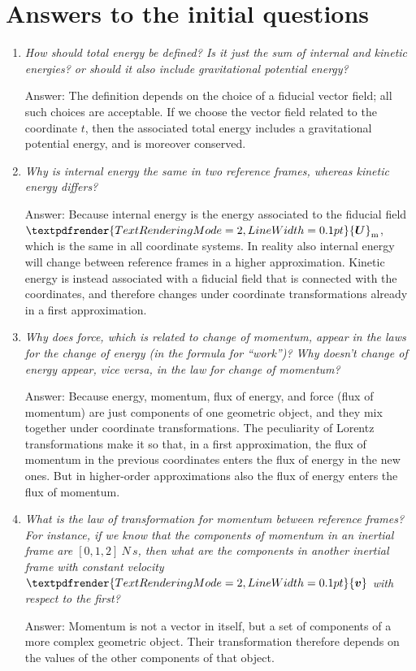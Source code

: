 \documentclass[\ifafour a4paper,12pt,\else a5paper,10pt,\fi%
onecolumn,oneside,article,%
british%
]{memoir}
\renewcommand*{\bm}[1]{\textpdfrender{TextRenderingMode=2,LineWidth=0.1pt}{\boldsymbol{#1}}}
\renewcommand*{\|}[1][]{\nonscript\:#1\vert\nonscript\:\mathopen{}}
\newcommand*{\yU}{\bm{U}}
\newcommand*{\yUm}{\yU_{\textrm{m}}}
\begin{document}
\section{Answers to the initial questions}
\label{sec:answers}

\begin{enumerate}[itemsep=1ex]
\item \emph{How should \emph{total energy} be defined? Is it just the sum of internal and kinetic energies? or should it also include gravitational potential energy?}

  Answer: The definition depends on the choice of a fiducial vector field; all such choices are acceptable. If we choose the vector field related to the coordinate $t$, then the associated total energy includes a gravitational potential energy, and is moreover conserved.


\item \emph{Why is \emph{internal energy} the same in two reference frames, whereas \emph{kinetic energy} differs?}

Answer: Because internal energy is the energy associated to the fiducial field $\yUm$, which is  the same in all coordinate systems. In reality also internal energy will change between reference frames in a higher approximation. Kinetic energy is instead associated with a fiducial field that is connected with the coordinates, and therefore changes under coordinate transformations already in a first approximation.


\item \emph{Why does force, which is related to change of momentum, appear in the laws for the change of energy (in the formula for \enquote{work})? Why doesn't change of energy appear, vice versa, in the law for change of momentum?}

  Answer: Because energy, momentum, flux of energy, and force (flux of momentum) are just components of one geometric object, and they mix together under coordinate transformations. The peculiarity of Lorentz transformations make it so that, in a first approximation, the flux of momentum in the previous coordinates enters the flux of energy in the new ones. But in higher-order approximations also the flux of energy enters the flux of momentum.


\item \emph{What is the \emph{law of transformation for momentum} between reference frames? For instance, if we know that the components of momentum in an inertial frame are $[0,1,2]\:\unit{N\,s}$, then what are the components in another inertial frame with constant velocity $\bm{v}$ with respect to the first?}

Answer: Momentum is not a vector in itself, but a set of components of a more complex geometric object. Their transformation therefore depends on the values of the other components of that object.
\end{enumerate}
\end{document}
